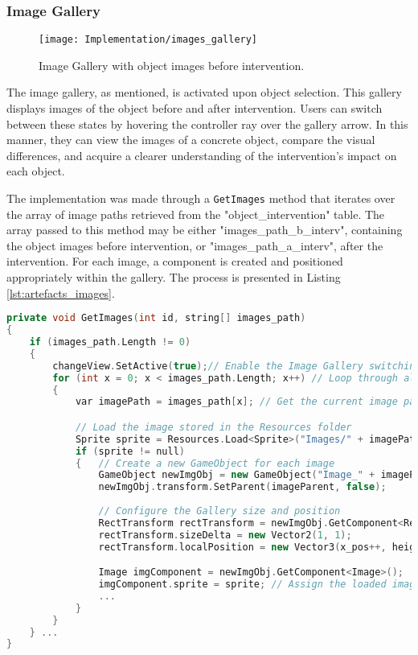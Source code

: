 \subsubsection{Image Gallery}
\label{sec:image_gallery}

\begin{figure}[h!]
    \centering
    \texttt{[image: Implementation/images\_gallery]}
    \caption{Image Gallery with object images before intervention.}
    \label{fig:image_gallery}
\end{figure}

The image gallery, as mentioned, is activated upon object selection. 
This gallery displays images of the object before and after intervention. 
Users can switch between these states by hovering the controller ray over the gallery arrow. 
In this manner, they can view the images of a concrete object, compare the visual differences, and acquire a clearer understanding of the intervention's impact on each object.

The implementation was made through a \texttt{GetImages} method that iterates over the array of image paths retrieved from the "object\_intervention" table. The array passed to this method may be either "images\_path\_b\_interv", containing the object images before intervention, or "images\_path\_a\_interv", after the intervention.
For each image, a component is created and positioned appropriately within the gallery.
The process is presented in Listing \ref{lst:artefacts_images}.

\begin{lstlisting}[language=C++, caption={Method used to load artefact images and to display them in the Images Gallery.}, label={lst:artefacts_images},float]
    private void GetImages(int id, string[] images_path)
{
    if (images_path.Length != 0)
    {
        changeView.SetActive(true);// Enable the Image Gallery switching images
        for (int x = 0; x < images_path.Length; x++) // Loop through all image paths
        {
            var imagePath = images_path[x]; // Get the current image path

            // Load the image stored in the Resources folder
            Sprite sprite = Resources.Load<Sprite>("Images/" + imagePath);
            if (sprite != null)
            {   // Create a new GameObject for each image
                GameObject newImgObj = new GameObject("Image_" + imagePath, typeof(RectTransform), typeof(CanvasRenderer), typeof(Image));
                newImgObj.transform.SetParent(imageParent, false); 
                
                // Configure the Gallery size and position
                RectTransform rectTransform = newImgObj.GetComponent<RectTransform>();
                rectTransform.sizeDelta = new Vector2(1, 1);
                rectTransform.localPosition = new Vector3(x_pos++, height, 0);

                Image imgComponent = newImgObj.GetComponent<Image>();
                imgComponent.sprite = sprite; // Assign the loaded image sprite 
                ...
            }
        }            
    } ...
}
\end{lstlisting}

